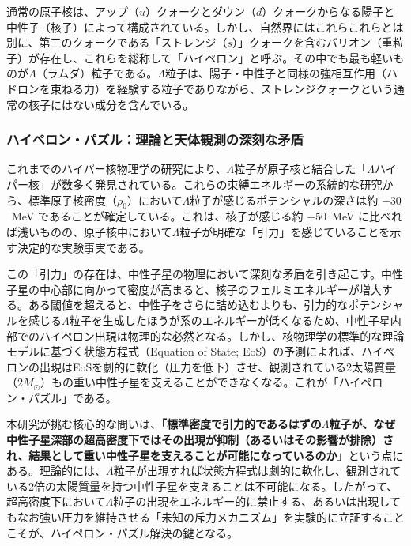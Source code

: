 \documentclass[11pt,a4j,dvipdfmx]{jarticle} 					%
\newcommand{\研究課題名}{加速器実験による短距離バリオン間相互作用の解明と中性子星ハイペロンパズルの解決}
\newcommand{\研究機関名}{東北大学}
\newcommand{\研究代表者氏名}{市川裕大}
\newcommand{\研究期間の最終元号年度}{13}  %
\begin{document}
通常の原子核は、アップ（$u$）クォークとダウン（$d$）クォークからなる陽子と中性子（核子）によって構成されている。しかし、自然界にはこれらこれらとは別に、第三のクォークである「ストレンジ（$s$）」クォークを含むバリオン（重粒子）が存在し、これらを総称して「ハイペロン」と呼ぶ。その中でも最も軽いものが$\Lambda$（ラムダ）粒子である。$\Lambda$粒子は、陽子・中性子と同様の強相互作用（ハドロンを束ねる力）を経験する粒子でありながら、ストレンジクォークという通常の核子にはない成分を含んでいる。

\subsubsection{ハイペロン・パズル：理論と天体観測の深刻な矛盾}
これまでのハイパー核物理学の研究により、$\Lambda$粒子が原子核と結合した「$\Lambda$ハイパー核」が数多く発見されている。これらの束縛エネルギーの系統的な研究から、標準原子核密度（$\rho_0$）において$\Lambda$粒子が感じるポテンシャルの深さは約 $-30$~MeV であることが確定している。これは、核子が感じる約 $-50$~MeV に比べれば浅いものの、原子核中において$\Lambda$粒子が明確な「引力」を感じていることを示す決定的な実験事実である。

この「引力」の存在は、中性子星の物理において深刻な矛盾を引き起こす。中性子星の中心部に向かって密度が高まると、核子のフェルミエネルギーが増大する。ある閾値を超えると、中性子をさらに詰め込むよりも、引力的なポテンシャルを感じる$\Lambda$粒子を生成したほうが系のエネルギーが低くなるため、中性子星内部でのハイペロン出現は物理的な必然となる。しかし、核物理学の標準的な理論モデルに基づく状態方程式（Equation of State; EoS）の予測によれば、ハイペロンの出現はEoSを劇的に軟化（圧力を低下）させ、観測されている2太陽質量（$2M_\odot$）もの重い中性子星を支えることができなくなる。これが「ハイペロン・パズル」である。

本研究が挑む核心的な問いは、\textbf{「標準密度で引力的であるはずの$\Lambda$粒子が、なぜ中性子星深部の超高密度下ではその出現が抑制（あるいはその影響が排除）され、結果として重い中性子星を支えることが可能になっているのか」}という点にある。理論的には、$\Lambda$粒子が出現すれば状態方程式は劇的に軟化し、観測されている2倍の太陽質量を持つ中性子星を支えることは不可能になる。したがって、超高密度下において$\Lambda$粒子の出現をエネルギー的に禁止する、あるいは出現してもなお強い圧力を維持させる「未知の斥力メカニズム」を実験的に立証することこそが、ハイペロン・パズル解決の鍵となる。
\end{document}
